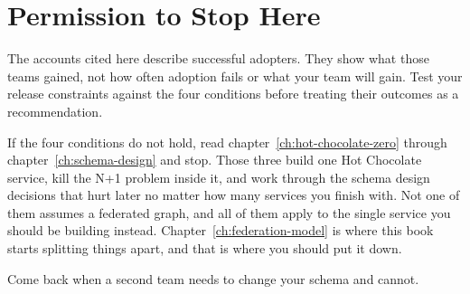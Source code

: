 \section{Permission to Stop Here}
\label{sec:ch01-permission-to-stop-here}

The accounts cited here describe successful adopters. They show what those
teams gained, not how often adoption fails or what your team will gain. Test
your release constraints against the four conditions before treating their
outcomes as a recommendation.

If the four conditions do not hold, read chapter~\ref{ch:hot-chocolate-zero}
through chapter~\ref{ch:schema-design} and stop. Those three build one Hot
Chocolate service, kill the N+1 problem inside it, and work through the schema
design decisions that hurt later no matter how many services you finish with.
Not one of them assumes a federated graph, and all of them apply to the single
service you should be building instead. Chapter~\ref{ch:federation-model} is
where this book starts splitting things apart, and that is where you should put
it down.

Come back when a second team needs to change your schema and cannot.
